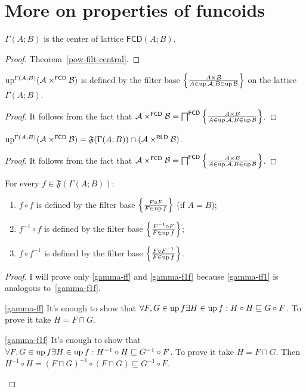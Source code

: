 \section{More on properties of funcoids}
\begin{prop}
$\Gamma(A;B)$ is the center of lattice $\mathsf{FCD}(A;B)$.\end{prop}
\begin{proof}
Theorem~\ref{pow-filt-central}.\end{proof}
\begin{prop}
$\operatorname{up}^{\Gamma(A;B)}(\mathcal{A}\times^{\mathsf{FCD}}\mathcal{B})$
is defined by the filter base $\left\{ \frac{A\times B}{A\in\operatorname{up}\mathcal{A},B\in\operatorname{up}\mathcal{B}}\right\}$
on the lattice $\Gamma(A;B)$.\end{prop}
\begin{proof}
It follows from the fact that $\mathcal{A}\times^{\mathsf{FCD}}\mathcal{B}=\bigsqcap^{\mathsf{FCD}}\left\{ \frac{A\times B}{A\in\operatorname{up}\mathcal{A},B\in\operatorname{up}\mathcal{B}}\right\}$.\end{proof}
\begin{prop}
$\operatorname{up}^{\Gamma(A;B)}(\mathcal{A}\times^{\mathsf{FCD}}\mathcal{B})=\mathfrak{F}(\Gamma(A;B))\cap(\mathcal{A}\times^{\mathsf{RLD}}\mathcal{B})$.\end{prop}
\begin{proof}
It follows from the fact that $\mathcal{A}\times^{\mathsf{FCD}}\mathcal{B}=\bigsqcap^{\mathsf{FCD}}\left\{ \frac{A\times B}{A\in\operatorname{up}\mathcal{A},B\in\operatorname{up}\mathcal{B}}\right\}$.\end{proof}
\begin{prop}
For every $f\in\mathfrak{F}(\Gamma(A;B))$:
\begin{enumerate}
\item \label{gamma-ff}$f\circ f$ is defined by the filter base $\left\{ \frac{F\circ F}{F\in\operatorname{up} f}\right\}$
(if $A=B$);
\item \label{gamma-f1f}$f^{-1}\circ f$ is defined by the filter base $\left\{ \frac{F^{-1}\circ F}{F\in\operatorname{up} f}\right\}$;
\item \label{gamma-ff1}$f\circ f^{-1}$ is defined by the filter base $\left\{ \frac{F\circ F^{-1}}{F\in\operatorname{up} f}\right\}$.
\end{enumerate}
\end{prop}
\begin{proof}
I will prove only \ref{gamma-ff} and \ref{gamma-f1f} because \ref{gamma-ff1}
is analogous to~\ref{gamma-f1f}.
\begin{widedisorder}
\item [{\ref{gamma-ff}}] It's enough to show that $\forall F,G\in\operatorname{up} f\exists H\in\operatorname{up} f:H\circ H\sqsubseteq G\circ F$.
To prove it take $H=F\sqcap G$.
\item [{\ref{gamma-f1f}}] It's enough to show that $\forall F,G\in\operatorname{up} f\exists H\in\operatorname{up} f:H^{-1}\circ H\sqsubseteq G^{-1}\circ F$.
To prove it take $H=F\sqcap G$. Then $H^{-1}\circ H=(F\sqcap G)^{-1}\circ(F\sqcap G)\sqsubseteq G^{-1}\circ F$.
\end{widedisorder}
\end{proof}
